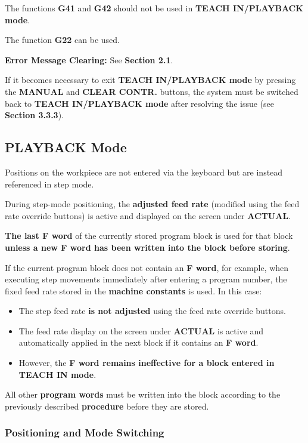 The functions \textbf{G41} and \textbf{G42} should not be used in \textbf{TEACH IN/PLAYBACK mode}.

The function \textbf{G22} can be used.

\textbf{Error Message Clearing:} See \textbf{Section 2.1}.

If it becomes necessary to exit \textbf{TEACH IN/PLAYBACK mode} by pressing the \textbf{MANUAL} and \textbf{CLEAR CONTR.} buttons, the system must be switched back to \textbf{TEACH IN/PLAYBACK mode} after resolving the issue (see \textbf{Section 3.3.3}).

\subsection{PLAYBACK Mode}

Positions on the workpiece are not entered via the keyboard but are instead referenced in step mode.

During step-mode positioning, the \textbf{adjusted feed rate} (modified using the feed rate override buttons) is active and displayed on the screen under \textbf{ACTUAL}.

\textbf{The last F word} of the currently stored program block is used for that block \textbf{unless a new F word has been written into the block before storing}.

If the current program block does not contain an \textbf{F word}, for example, when executing step movements immediately after entering a program number, the fixed feed rate stored in the \textbf{machine constants} is used. In this case:

\begin{itemize}
    \item The step feed rate \textbf{is not adjusted} using the feed rate override buttons.
    \item The feed rate display on the screen under \textbf{ACTUAL} is active and automatically applied in the next block if it contains an \textbf{F word}.
    \item However, the \textbf{F word remains ineffective for a block entered in TEACH IN mode}.
\end{itemize}

All other \textbf{program words} must be written into the block according to the previously described \textbf{procedure} before they are stored.

\newpage

\subsubsection*{Positioning and Mode Switching}

